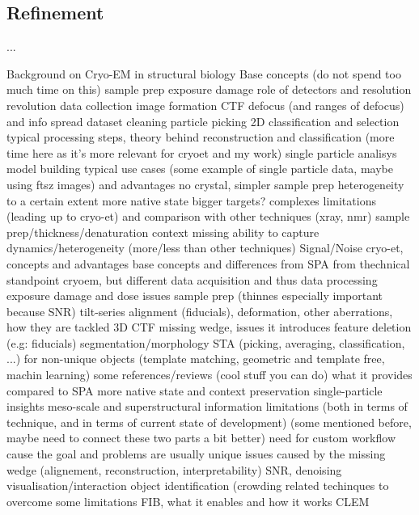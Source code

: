 \subsection{Refinement}\label{refinement}
...

\FloatBarrier

\begin{outline}
\1 Background on Cryo-EM in structural biology
    \2 Base concepts (do not spend too much time on this)
        \3 \tick sample prep
        \3 \tick exposure damage
        \3 \tick role of detectors and resolution revolution \cite{faruqiCCDDetectorsHighresolution2000}
        \3 \tick data collection
        \3 \tick image formation
        \3 \tick CTF
        \3 \tick defocus (and ranges of defocus) and info spread
        \3 \tick dataset cleaning
        \3 particle picking
        \3 2D classification and selection
        \3 typical processing steps, theory behind reconstruction and classification (more time here as it's more relevant for cryoet and my work)
        \3 single particle analisys
        \3 model building
    \2 typical use cases (some example of single particle data, maybe using ftsz images) and advantages
        \3 no crystal, simpler sample prep
        \3 heterogeneity to a certain extent
        \3 more native state
        \3 bigger targets? complexes
    \2 limitations (leading up to cryo-et) and comparison with other techniques (xray, nmr)
        \3 sample prep/thickness/denaturation
        \3 context missing
        \3 ability to capture dynamics/heterogeneity (more/less than other techniques)
        \3 Signal/Noise
\1 cryo-et, concepts and advantages
    \2 base concepts and differences from SPA from thechnical standpoint
        \2 cryoem, but different data acquisition and thus data processing
        \3 exposure damage and dose issues
        \3 sample prep (thinnes especially important because SNR)
        \3 tilt-series alignment (fiducials), deformation, other aberrations, how they are tackled
        \3 3D CTF
        \3 missing wedge, issues it introduces
        \3 feature deletion (e.g: fiducials)
        \3 segmentation/morphology
        \3 STA (picking, averaging, classification, ...) for non-unique objects (template matching, geometric and template free, machin learning)
    \2 some references/reviews (cool stuff you can do)
        \3 \cite{turkPromiseChallengesCryoelectron2020,lucicCryoelectronTomographyChallenge2013}
    \2 what it provides compared to SPA
        \3 more native state and context preservation
        \3 single-particle insights
        \3 meso-scale and superstructural information
    \2 limitations (both in terms of technique, and in terms of current state of development)
        \3 (some mentioned before, maybe need to connect these two parts a bit better)
        \3 need for custom workflow cause the goal and problems are usually unique
        \3 issues caused by the missing wedge (alignement, reconstruction, interpretability)
        \3 SNR, denoising
        \3 visualisation/interaction
        \3 object identification (crowding
    \2 related techinques to overcome some limitations
        \3 FIB, what it enables and how it works
        \2 CLEM
\end{outline}
